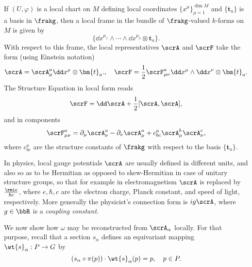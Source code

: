 \begin{rem}\label{rem 1.3.10 RS2}
    If $(U,\varphi)$ is a local chart on $M$ defining local coordinates $\{x^\mu\}_{\mu=1}^{\dim M}$ and $\{\bm{t}_a\}$ is a basis in $\frakg$, then a local frame in the bundle of $\frakg$-valued $k$-forms on $M$ is given by
    \[\{\dd x^{\mu_1}\wedge\cdots\wedge \dd x^{\mu_k}\otimes\bm{t}_a\}.\]
    With respect to this frame, the local representatives $\scrA$ and $\scrF$ take the form (using Einstein notation)
    \[\scrA=\scrA_\mu^a \dd x^\mu \otimes\bm{t}_a.,\quad \scrF=\frac12 \scrF_{\mu\nu}^a \dd x^\mu\wedge\dd x^\nu\otimes \bm{t}_a.\]
    The Structure Equation in local form reads
    \[\scrF=\dd\scrA+ \frac12[\scrA,\scrA],\]
    and in components
    \[\scrF_{\mu\nu}^a=\partial_\mu \scrA_\nu^a-\partial_\nu \scrA_\mu^a+c^a_{bc}\scrA^b_\mu \scrA_\nu^c,\]
    where $c^a_{bc}$ are the structure constants of $\frakg$ with respect to the basis $\{\bm{t}_a\}$.

    In physics, local gauge potentials $\scrA$ are usually defined in different units, and also so as to be Hermitian as opposed to skew-Hermitian in case of unitary structure groups, so that for example in electromagnetism $\scrA$ is replaced by $\frac{\rmi e}{\hbar c}$, where $e,\hbar,c$ are the electron charge, Planck constant, and speed of light, respectively. More generally the physicist's connection form is $ig \scrA$, where $g\in\bbR$ is a \emph{coupling constant}.
\end{rem}


We now show how $\omega$ may be reconstructed from $\scrA_\alpha$ locally. For that purpose, recall that a section $s_\alpha$ defines an equivariant mapping $\wt{s}_\alpha:P\to G$ by
\[(s_\alpha\circ\pi(p))\cdot \wt{s}_\alpha(p)=p,\quad p\in P.\label{eq 1.3.13 RS2}\]

